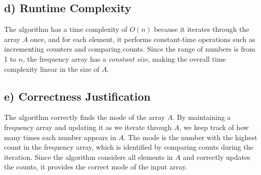 \documentclass[12pt, letterpaper]{article}
\begin{document}
\subsection{d) Runtime Complexity}
The algorithm has a time complexity of $O(n)$ because it iterates through the array $A$ once, and for each element, it performs constant-time operations such as incrementing counters and comparing counts. Since the range of numbers is from 1 to $n$, the frequency array has a \textit{constant size}, making the overall time complexity linear in the size of $A$.

\subsection{e) Correctness Justification}
The algorithm correctly finds the mode of the array $A$. By maintaining a frequency array and updating it as we iterate through $A$, we keep track of how many times each number appears in $A$. The mode is the number with the highest count in the frequency array, which is identified by comparing counts during the iteration. Since the algorithm considers all elements in $A$ and correctly updates the counts, it provides the correct mode of the input array.


\newpage
\end{document}
